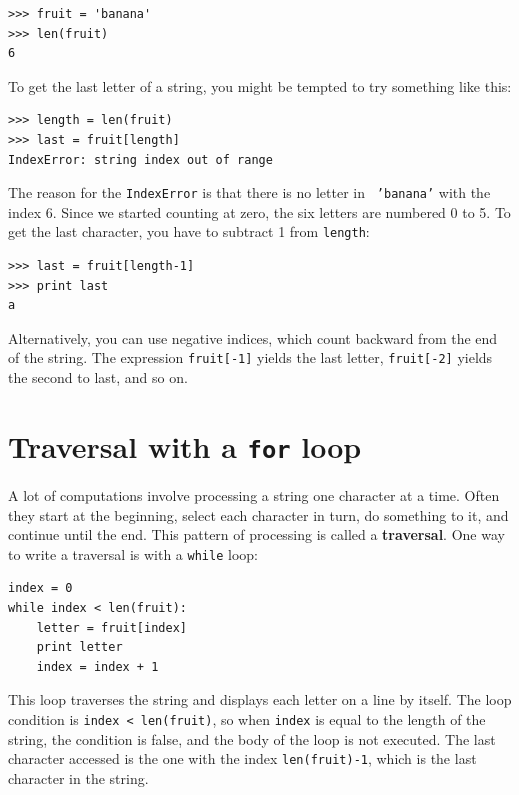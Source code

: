 \documentclass[10pt]{book}
\begin{document}
\beforeverb
\begin{verbatim}
>>> fruit = 'banana'
>>> len(fruit)
6
\end{verbatim}
\afterverb
%
To get the last letter of a string, you might be tempted to try something
like this:


\beforeverb
\begin{verbatim}
>>> length = len(fruit)
>>> last = fruit[length]
IndexError: string index out of range
\end{verbatim}
\afterverb
%
The reason for the {\tt IndexError} is that there is no letter in {\tt
'banana'} with the index 6.  Since we started counting at zero, the
six letters are numbered 0 to 5.  To get the last character, you have
to subtract 1 from {\tt length}:

\beforeverb
\begin{verbatim}
>>> last = fruit[length-1]
>>> print last
a
\end{verbatim}
\afterverb
%
Alternatively, you can use negative indices, which count backward from
the end of the string.  The expression {\tt fruit[-1]} yields the last
letter, {\tt fruit[-2]} yields the second to last, and so on.



\section{Traversal with a {\tt for} loop}
\label{for}


A lot of computations involve processing a string one character at a
time.  Often they start at the beginning, select each character in
turn, do something to it, and continue until the end.  This pattern of
processing is called a {\bf traversal}.  One way to write a traversal
is with a {\tt while} loop:

\beforeverb
\begin{verbatim}
index = 0
while index < len(fruit):
    letter = fruit[index]
    print letter
    index = index + 1
\end{verbatim}
\afterverb
%
This loop traverses the string and displays each letter on a line by
itself.  The loop condition is {\tt index < len(fruit)}, so
when {\tt index} is equal to the length of the string, the
condition is false, and the body of the loop is not executed.  The
last character accessed is the one with the index {\tt len(fruit)-1},
which is the last character in the string.
\end{document}
